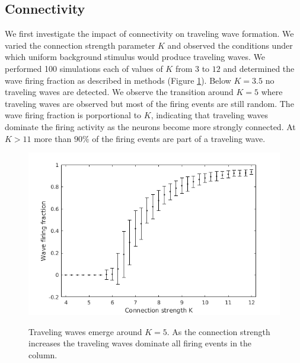 \documentclass[a4paper,11pt]{article}
\begin{document}
\subsection{Connectivity} \label{sub:connectivity}
We first investigate the impact of connectivity on traveling wave formation.
We varied the connection strength parameter $K$ and observed the conditions under which uniform background stimulus would produce traveling waves.
We performed 100 simulations each of values of $K$ from $3$ to $12$ and determined the wave firing fraction as described in methods (Figure \ref{fig:conn_fraction}).
Below $K=3.5$ no traveling waves are detected.
We observe the transition around $K=5$ where traveling waves are observed but most of the firing events are still random.
The wave firing fraction is porportional to $K$, indicating that traveling waves dominate the firing activity as the neurons become more strongly connected.
At $K>11$ more than $90\%$ of the firing events are part of a traveling wave.
\begin{figure}[!ht]
 \caption{Traveling waves emerge around $K=5$. As the connection strength increases the traveling waves dominate all firing events in the column.}
 \centering
   \includegraphics[width=\textwidth]{fig/ConnectionStrengthWaveFraction}  
 \label{fig:conn_fraction}
\end{figure}
\end{document}
